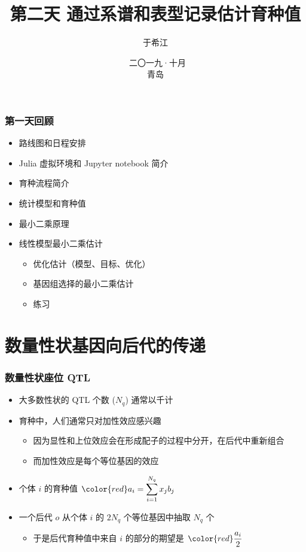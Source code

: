 \documentclass[serif,aspectratio=169]{beamer}
\begin{document}
\title{第二天 通过系谱和表型记录估计育种值}
\author{于希江}
\date{\tiny{~{二〇一九·十月} \\青岛}}


\begin{frame}
  \frametitle{第一天回顾}
  \begin{itemize}
  \item 路线图和日程安排
  \item Julia 虚拟环境和 Jupyter notebook 简介
  \item 育种流程简介
  \item 统计模型和育种值
  \item 最小二乘原理
  \item 线性模型最小二乘估计
    \begin{itemize}
    \item 优化估计（模型、目标、优化）
    \item 基因组选择的最小二乘估计
    \item 练习
    \end{itemize}
  \end{itemize}
\end{frame}
    

\frame{
  \titlepage
}

\section{数量性状基因向后代的传递}

\begin{frame}
  \frametitle{数量性状座位 QTL}
  \begin{itemize}
  \item 大多数性状的 QTL 个数 ($N_q$) 通常以千计
  \item 育种中，人们通常只对加性效应感兴趣
    \begin{itemize}
    \item 因为显性和上位效应会在形成配子的过程中分开，在后代中重新组合
    \item 而加性效应是每个等位基因的效应
    \end{itemize}
  \item 个体 $i$ 的育种值 $\displaystyle{\color{red}a_i=\sum_{i=1}^{N_q} x_jb_j}$
  \item 一个后代 $o$ 从个体 $i$ 的 $2N_q$ 个等位基因中抽取 $N_q$ 个
    \begin{itemize}
    \item 于是后代育种值中来自 $i$ 的部分的期望是 $\displaystyle{\color{red}\frac{a_i}{2}}$
    \end{itemize}
  \end{itemize}
\end{frame}
\end{document}
